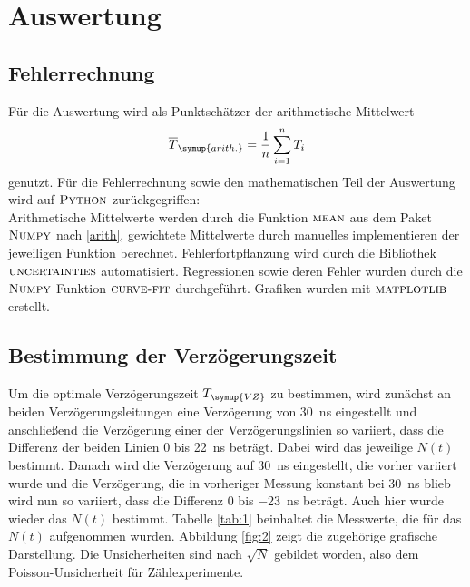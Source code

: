 \documentclass[
  bibliography=totoc,     %
  captions=tableheading,  %
  titlepage=firstiscover, %
]{scrartcl}
\begin{document}
\section{Auswertung}
\label{sec:auswertung}

\subsection{Fehlerrechnung}
  Für die Auswertung wird als Punktschätzer der arithmetische Mittelwert
  \begin{equation}
    \overline{T}_{\symup{arith.}} = \frac{1}{n} \sum_{i=1}^{n} T_{i}
    \label{arith}
  \end{equation}
  genutzt.
    Für die Fehlerrechnung sowie den mathematischen Teil der Auswertung wird auf
    $\textsc{Python}$ zurückgegriffen:\\
    Arithmetische Mittelwerte werden durch die Funktion $\textsc{mean}$ aus dem
    Paket $\textsc{Numpy}$ \cite{numpy} nach \eqref{arith},
    gewichtete Mittelwerte durch manuelles implementieren der jeweiligen
    Funktion berechnet. Fehlerfortpflanzung wird durch die Bibliothek
    $\textsc{uncertainties}$ \cite{uncertainties} automatisiert. Regressionen
    sowie deren Fehler wurden durch die $\textsc{Numpy}$ Funktion
    $\textsc{curve-fit}$ durchgeführt. Grafiken wurden mit $\textsc{matplotlib}$
    \cite{matplotlib} erstellt.
\subsection{Bestimmung der Verzögerungszeit}
Um die optimale Verzögerungszeit $T_{\symup{VZ}}$ zu bestimmen, wird zunächst an beiden
Verzögerungsleitungen eine Verzögerung von \SI{30}{\nano\second} eingestellt und
anschließend die Verzögerung einer der Verzögerungslinien so variiert, dass die Differenz
der beiden Linien 0 bis \SI{22}{\nano\second} beträgt. Dabei wird das jeweilige $N(t)$ bestimmt.
Danach wird die Verzögerung auf \SI{30}{\nano\second} eingestellt, die vorher variiert
wurde und die Verzögerung, die in vorheriger Messung konstant bei \SI{30}{\nano\second}
blieb wird nun so variiert, dass die Differenz 0 bis \SI{-23}{\nano\second} beträgt.
Auch hier wurde wieder das $N(t)$ bestimmt. Tabelle \ref{tab:1} beinhaltet die
Messwerte, die für das $N(t)$ aufgenommen wurden. Abbildung \ref{fig:2} zeigt die
zugehörige grafische Darstellung. Die Unsicherheiten sind nach $\sqrt{N}$ gebildet
worden, also dem Poisson-Unsicherheit für Zählexperimente.
\end{document}
